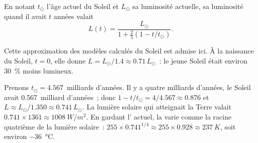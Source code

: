 \begin{proposition}\label{prop:g12:early-earth:luminosity}
En notant $t_\odot$ l'âge actuel du Soleil et $L_\odot$ sa luminosité
actuelle, sa luminosité quand il avait $t$ années valait
\[
  L(t) = \frac{L_\odot}{1 + \frac{2}{5}\left(1 - t/t_\odot\right)} .
\]
\end{proposition}

Cette approximation des modèles calculés du Soleil est admise ici. À la
naissance du Soleil, $t = 0$, elle donne $L = L_\odot/1.4 \approx 0.71\,L_\odot$~:
le jeune Soleil était environ \qty{30}{\percent} moins lumineux.

\begin{example}\label{ex:g12:early-earth:young-sun}
Prenons $t_\odot = 4.567$~milliards d'années. Il y a quatre milliards
d'années, le Soleil avait 0.567~milliard d'années~; donc
$1 - t/t_\odot = 4/4.567 \approx 0.876$ et
$L \approx L_\odot/1.350 \approx 0.741\,L_\odot$. La lumière solaire qui
atteignait la Terre valait $0.741 \times 1361 \approx \qty{1008}{W/m^2}$.
En gardant l' actuel, la  varie comme la
racine quatrième de la lumière solaire~: $255 \times 0.741^{1/4} \approx 255 \times 0.928 \approx
\qty{237}{K}$, soit environ \qty{-36}{\celsius}.
\end{example}

